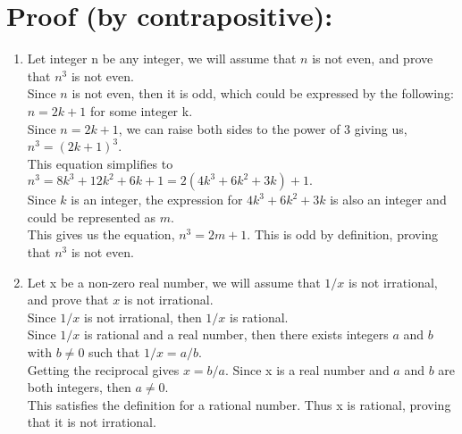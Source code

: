 \documentclass[11pt]{article}
\begin{document}
\section{Proof (by contrapositive):}
\begin{enumerate}
    \item Let integer n be any integer, we will assume that $n$ is not even, and prove that $n^3$ is not even. \\
    Since $n$ is not even, then it is odd, which could be expressed by the following: $n = 2k + 1$ for some integer k. \\
    Since $n = 2k + 1$, we can raise both sides to the power of $3$ giving us, $n^3 = (2k + 1)^3$. \\
    This equation simplifies to $n^3 = 8k^3 + 12k^2 + 6k + 1 = 2(4k^3 + 6k^2 + 3k) + 1.$ \\
    Since $k$ is an integer, the expression for $4k^3 + 6k^2 + 3k$ is also an integer and could be represented as $m$. \\
    This gives us the equation, $n^3 = 2m + 1$. This is odd by definition, proving that $n^3$ is not even.

    \item Let x be a non-zero real number, we will assume that $1/x$ is not irrational, and prove that $x$ is not irrational. \\
    Since $1/x$ is not irrational, then $1/x$ is rational. \\
    Since $1/x$ is rational and a real number, then there exists integers $a$ and $b$ with $b \neq 0$ such that $1/x = a/b$. \\
    Getting the reciprocal gives $x = b/a$. Since x is a real number and $a$ and $b$ are both integers, then $a \neq 0$. \\
    This satisfies the definition for a rational number. Thus x is rational, proving that it is not irrational.
\end{enumerate}
\end{document}
